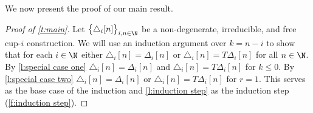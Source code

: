 We now present the proof of our main result.

\begin{proof}[Proof of \cref{t:main}]
	Let $\big\{ \triangle_i [n] \big\}_{i,n\in\N}$ be a non-degenerate, irreducible, and free \mbox{cup-$i$} construction.
	We will use an induction argument over $k = n-i$ to show that for each $i \in \N$ either $\triangle_i [n] = \Delta_i [n]$ or
	$\triangle_i [n] = T \Delta_i [n]$ for all $n \in \N$.
	By \cref{l:special case one} $\triangle_i [n] = \Delta_i [n]$ and $\triangle_i [n] = T \Delta_i [n]$ for $k \leq 0$.
	By \cref{l:special case two} $\triangle_i [n] = \Delta_i [n]$ or $\triangle_i [n] = T \Delta_i [n]$ for $r = 1$.
	This serves as the base case of the induction and \cref{l:induction step} as the induction step (\cref{f:induction step}).
\end{proof}